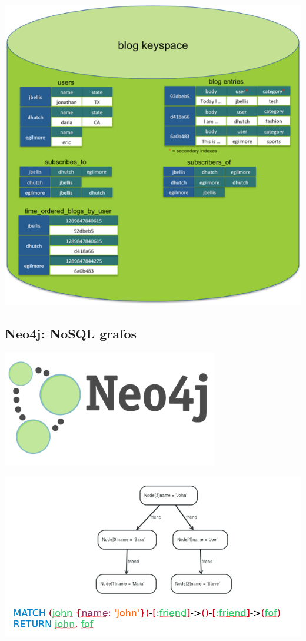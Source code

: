 \documentclass[
]{book}
\begin{document}
\includegraphics{images/BlogNoSQL.png}

\hypertarget{neo4j-nosql-grafos}{%
\subsection{Neo4j: NoSQL grafos}\label{neo4j-nosql-grafos}}

\includegraphics{images/Neo4jlogo.png}

\includegraphics{images/CypherQuery.png}
\end{document}
